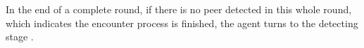 In the end of a complete round, if there is no peer detected in this whole round, 
which indicates the encounter process is finished, the agent turns to the detecting stage .






